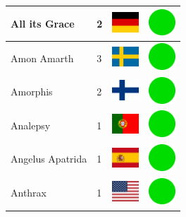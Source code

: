\documentclass[12pt, a4paper, twoside]{report}
\begin{document}
\begin{center}
\begin{longtable}{|p{5cm}|p{2cm}|p{2cm}|p{2cm}|}
			All its Grace & 2 & \includegraphics[width=1cm]{4x3/de} & \includegraphics[width=1cm]{likes/y} \\ \hline
			Amon Amarth & 3 & \includegraphics[width=1cm]{4x3/se} & \includegraphics[width=1cm]{likes/y} \\ \hline
			Amorphis & 2 & \includegraphics[width=1cm]{4x3/fi} & \includegraphics[width=1cm]{likes/y} \\ \hline
			Analepsy & 1 & \includegraphics[width=1cm]{4x3/pt} & \includegraphics[width=1cm]{likes/y} \\ \hline
			Angelus Apatrida & 1 & \includegraphics[width=1cm]{4x3/es} & \includegraphics[width=1cm]{likes/y} \\ \hline
			Anthrax & 1 & \includegraphics[width=1cm]{4x3/us} & \includegraphics[width=1cm]{likes/y} \\ \hline

\end{longtable}
\end{center}
\end{document}
